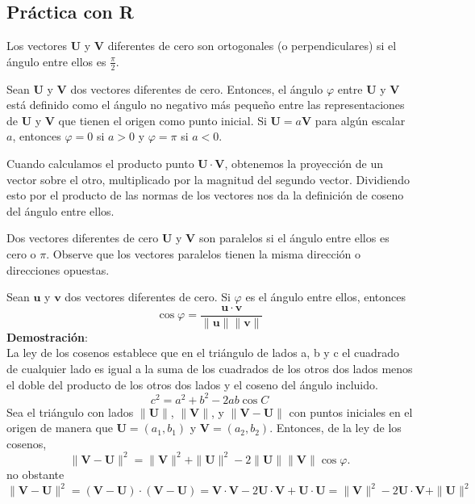 \subsection{Práctica con R}
\begin{}
\begin{definition}
 Los vectores $\mathbf{U}$ y $\mathbf{V}$ diferentes de cero son ortogonales (o perpendiculares) si el ángulo entre ellos es $\frac{\pi}{2}$.
\end{definition}

\begin{definition}
    Sean $\mathbf{U}$ y $\mathbf{V}$ dos vectores diferentes de cero. Entonces, el ángulo $\varphi$ entre $\mathbf{U}$ y $\mathbf{V}$ está definido como el ángulo no negativo más pequeño entre las representaciones de $\mathbf{U}$ y $\mathbf{V}$ que tienen el origen como punto inicial. Si $\mathbf{U} = a\mathbf{V}$ para algún escalar $a$, entonces $\varphi = 0$ si $a > 0$ y $\varphi= \pi$ si $a < 0$.
\end{definition}

\begin{remark}
Cuando calculamos el producto punto 
$\boldsymbol{U\cdot V}$, obtenemos la proyección de un vector sobre el otro, multiplicado por la magnitud del segundo vector. Dividiendo esto por el producto de las normas de los vectores nos da la definición de coseno del ángulo entre ellos.
\end{remark}
\begin{definition}
    Dos vectores diferentes de cero $\boldsymbol{U}$ y $\boldsymbol{V}$ son paralelos si el ángulo entre ellos es cero o $\pi$. 
Observe que los vectores paralelos tienen la misma dirección o direcciones opuestas.
\end{definition}
\begin{tcolorbox}[colback=white!5!white,colframe=red!50!red,title=Teorema]
Sean $\mathbf{u}$ y $\mathbf{v}$ dos vectores diferentes de cero. Si $\varphi$ es el ángulo entre ellos, entonces
\[
\cos \varphi
= \frac{\mathbf{u} \cdot \mathbf{v}}{\|\mathbf{u}\| \|\mathbf{v}\|}
\]
\textbf{Demostración}:\\
La ley de los cosenos establece que en el triángulo de lados a, b y c el cuadrado de cualquier lado  es igual a la suma de los cuadrados de los otros dos lados menos el doble del producto de los otros dos lados y el coseno del ángulo incluido.$$c^2 = a^2 + b^2 - 2ab \cos C$$
Sea el triángulo con lados $\|\mathbf{U}\|$, $\|\mathbf{V}\|$, y $\|\mathbf{V} -\mathbf{U}\|$ con  puntos iniciales en el origen de manera que $\mathbf{U} = (a_1, b_1)$ y $\mathbf{V} = (a_2, b_2)$. Entonces, de la ley de los cosenos,
$$
\|\mathbf{V} - \mathbf{U}\|^2 = \|\mathbf{V}\|^2 + \|\mathbf{U}\|^2 - 2\|\mathbf{U}\|\|\mathbf{V}\|\cos \varphi.
$$
no obstante \[
\|\mathbf{V} - \mathbf{U}\|^2 = (\mathbf{V} - \mathbf{U}) \cdot (\mathbf{V} - \mathbf{U}) = \mathbf{V} \cdot \mathbf{V} - 2\mathbf{U} \cdot \mathbf{V} + \mathbf{U} \cdot \mathbf{U} = \|\mathbf{V}\|^2 - 2\mathbf{U} \cdot \mathbf{V} + \|\mathbf{U}\|^2
\]


\end{tcolorbox}
\end{}
